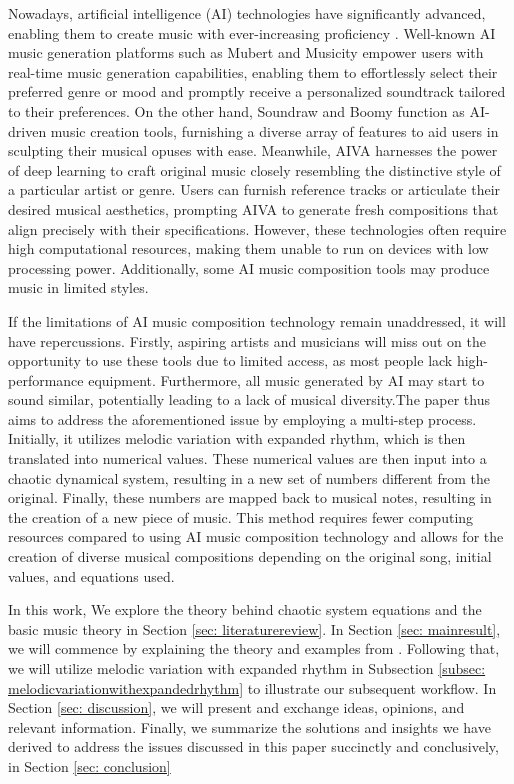 \documentclass[11pt]{article}
\theoremstyle{definition}
\begin{document}
Nowadays, artificial intelligence (AI) technologies have significantly advanced, enabling them to create music with ever-increasing proficiency \cite{bonnici_music_2021}. 
Well-known AI music generation platforms such as  Mubert \cite{mubert_website} and 
Musicity \cite{musicfy_website} empower users with real-time music generation capabilities, 
enabling them to effortlessly select their preferred genre or mood and promptly receive a personalized soundtrack tailored to their preferences. On the other hand, Soundraw \cite{soundraw_website} and Boomy \cite{boomy_website} function as AI-driven music creation tools, furnishing a diverse array of features to aid users in sculpting their musical opuses with ease. Meanwhile, AIVA \cite{aiva_website} harnesses the power of deep learning to craft original music closely resembling the distinctive style of a particular artist or genre. Users can furnish reference tracks or articulate their desired musical aesthetics, prompting AIVA to generate fresh compositions that align precisely with their specifications. However, these technologies often require high computational resources, making them unable to run on devices with low processing power. Additionally, some AI music composition tools may produce music in limited styles.

If the limitations of AI music composition technology remain unaddressed, it will have repercussions. Firstly, aspiring artists and musicians will miss out on the opportunity to use these tools due to limited access, as most people lack high-performance equipment. Furthermore, all music generated by AI may start to sound similar, potentially leading to a lack of musical diversity.The paper thus aims to address the aforementioned issue by employing a multi-step process. Initially, it utilizes melodic variation with expanded rhythm, which is then translated into numerical values. These numerical values are then input into a chaotic dynamical system, resulting in a new set of numbers different from the original. Finally, these numbers are mapped back to musical notes, resulting in the creation of a new piece of music. This method requires fewer computing resources compared to using AI music composition technology and allows for the creation of diverse musical compositions depending on the original song, initial values, and equations used.

In this work, We explore the theory behind chaotic system equations and the basic music theory in Section \ref{sec: literaturereview}. In Section \ref{sec: mainresult}, we will commence by explaining the theory and examples from \cite{dabby_musical_1996}. Following that, we will utilize melodic variation with expanded rhythm in Subsection \ref{subsec: melodicvariationwithexpandedrhythm} to illustrate our subsequent workflow. In Section \ref{sec: discussion}, we will present and exchange ideas, opinions, and relevant information. Finally,  we summarize the solutions and insights we have derived to address the issues discussed in this paper succinctly and conclusively, in Section \ref{sec: conclusion}
\end{document}
